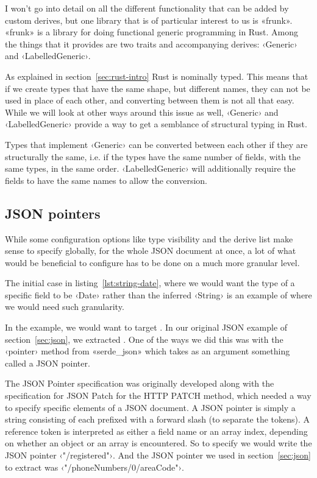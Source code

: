 I won't go into detail on all the different functionality that can be added by custom derives, but one library that is of particular interest to us is «frunk». «frunk» is a library for doing functional generic programming in Rust. Among the things that it provides are two traits and accompanying derives: ‹Generic› and ‹LabelledGeneric›.


As explained in section~\ref{sec:rust-intro} Rust is nominally typed. This means that if we create types that have the same shape, but different names, they can not be used in place of each other, and converting between them is not all that easy. While we will look at other ways around this issue as well, ‹Generic› and ‹LabelledGeneric› provide a way to get a semblance of structural typing in Rust.

Types that implement ‹Generic› can be converted between each other if they are structurally the same, i.e. if the types have the same number of fields, with the same types, in the same order. ‹LabelledGeneric› will additionally require the fields to have the same names to allow the conversion.

\subsection{JSON pointers}
\label{sec:json-pointers}

While some configuration options like type visibility and the derive list make sense to specify globally, for the whole JSON document at once, a lot of what would be beneficial to configure has to be done on a much more granular level.

The initial case in listing~\ref{lst:string-date}, where we would want the type of a specific field to be ‹Date› rather than the inferred ‹String› is an example of where we would need such granularity.

In the example, we would want to target . In our original JSON example of section~\ref{sec:json}, we extracted . One of the ways we did this was with the ‹pointer› method from «serde_json» which takes as an argument something called a JSON pointer.

The JSON Pointer specification\cite{RFC6901} was originally developed along with the specification for JSON Patch\cite{RFC6902} for the HTTP PATCH method, which needed a way to specify specific elements of a JSON document. A JSON pointer is simply a string consisting of  each prefixed with a forward slash (to separate the tokens). A reference token is interpreted as either a field name or an array index, depending on whether an object or an array is encountered. So to specify  we would write the JSON pointer ‹"/registered"›. And the JSON pointer we used in section~\ref{sec:json} to extract  was ‹"/phoneNumbers/0/areaCode"›.

